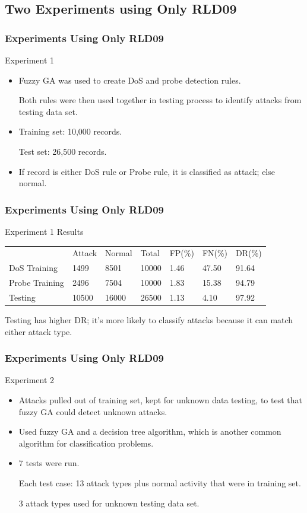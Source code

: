 \documentclass{beamer}
\newcommand{\linespace}{\vskip 0.25cm}
\begin{document}
\subsection{Two Experiments using Only RLD09}
\begin{frame}
	\frametitle{Experiments Using Only RLD09}
	Experiment 1
	\begin{itemize}
		\item Fuzzy GA was used to create DoS and probe detection rules. 
		
		Both rules were then used together in testing process to identify attacks from testing data set.
		
		\linespace
		\linespace
		
		\item Training set: 10,000 records.
		
		Test set: 26,500 records.

		\linespace
		\linespace

		\item If record is either DoS rule or Probe rule, it is classified as attack; else normal.
\end{itemize}
\end{frame}


\begin{frame}
	\frametitle{Experiments Using Only RLD09}
	Experiment 1 Results
\begin{table}
\begin{small}
\begin{tabular}{lllllll}
 & Attack & Normal & Total & FP(\%) & FN(\%) & DR(\%)\\
DoS Training & 1499 & 8501 & 10000 & 1.46 & 47.50 & 91.64\\
Probe Training & 2496 & 7504 & 10000 & 1.83 & 15.38 & 94.79\\
Testing & 10500 & 16000 & 26500 & 1.13 & 4.10 & 97.92\\
\end{tabular}
\end{small}
\end{table}

\begin{center}
Testing has higher DR; it's more likely to classify attacks because it can match either attack type.
\end{center}
\end{frame}


\begin{frame}
	\frametitle{Experiments Using Only RLD09}
Experiment 2
	\begin{itemize}
		\item Attacks pulled out of training set, kept for unknown data testing, to test that fuzzy GA could detect unknown attacks.
		\item Used fuzzy GA and a decision tree algorithm, which is another common algorithm for classification problems.
		\item 7 tests were run. 
		
		Each test case: 13 attack types plus normal activity that were in training set. 
		
		3 attack types used for unknown testing data set.
	\end{itemize}
\end{frame}
\end{document}
